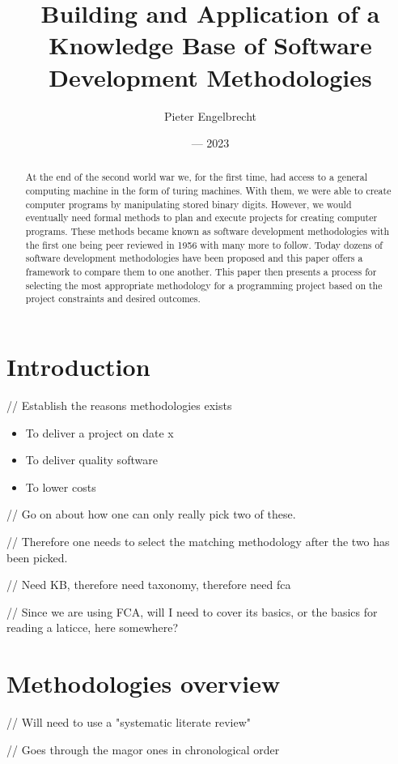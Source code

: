 \documentclass{article}
\title{Building and Application of a Knowledge Base of Software Development Methodologies}
\author{Pieter Engelbrecht}
\date{--- 2023}
\begin{document}
\maketitle

\begin{abstract}
  At the end of the second world war we, for the first time, had access to a general computing machine in the form of turing machines.
  With them, we were able to create computer programs by manipulating stored binary digits.
  However, we would eventually need formal methods to plan and execute projects for creating computer programs.
  These methods became known as software development methodologies with the first one being peer reviewed in 1956 with many more to follow.
  Today dozens of software development methodologies have been proposed and this paper offers a framework to compare them to one another.
  This paper then presents a process for selecting the most appropriate methodology for a programming project based on the project constraints and desired outcomes.
\end{abstract}

\section{Introduction}
// Establish the reasons methodologies exists

\begin{itemize}
    \item To deliver a project on date x
    \item To deliver quality software
    \item To lower costs
\end{itemize}

// Go on about how one can only really pick two of these.

// Therefore one needs to select the matching methodology after the two has been picked.

// Need KB, therefore need taxonomy, therefore need fca

// Since we are using FCA, will I need to cover its basics, or the basics for reading a laticce, here somewhere?

\section{Methodologies overview}
// Will need to use a "systematic literate review"

// Goes through the magor ones in chronological order
\end{document}
